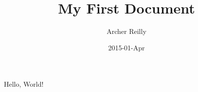\documentclass{article}
\title{My First Document}
\date{2015-01-Apr}
\author{Archer Reilly}
\begin{document}
  \maketitle
  \newpage

Hello, World!
\end{document}
